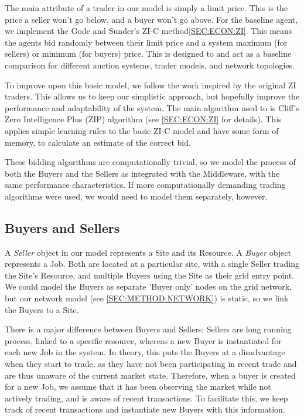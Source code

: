 The main attribute of a trader in our model is simply a limit price. This is
the price a seller won't go below, and a buyer won't go above. For the baseline
agent, we implement the Gode and Sunder's ZI-C method\ref{SEC:ECON:ZI}. This
means the agents bid randomly between their limit price and a system maximum
(for sellers) or minimum (for buyers) price. This is designed to and act as a
baseline comparison for different auction systems, trader models, and network
topologies.

To improve upon this basic model, we follow the work inspired by the original
ZI traders. This allows us to keep our simplistic approach, but hopefully
improve the performance and adaptability of the system. The main algorithm used
to is Cliff's Zero Intelligence Plus (ZIP) algorithm (see \ref{SEC:ECON:ZI} for
details).  This applies simple learning rules to the basic ZI-C model and have
some form of memory, to calculate an estimate of the correct bid. 

These bidding algorithms are computationally trivial, so we model the process
of both the Buyers and the Sellers as integrated with the Middleware, with the
same performance characteristics. If more computationally demanding trading
algorithms were used, we would need to model them separately, however.

\subsection{Buyers and Sellers}

A \textit{Seller} object in our model represents a Site and its Resource.  A
\textit{Buyer} object represents a Job. Both are located at a particular site,
with a single Seller trading the Site's Resource, and multiple Buyers using the
Site as their grid entry point. We could model the Buyers as separate 'Buyer
only' nodes on the grid network, but our network model (see
\ref{SEC:METHOD:NETWORK}) is static, so we link the Buyers to a Site. 

There is a major difference between Buyers and Sellers; Sellers are long running
process, linked to a specific resource, whereas a new Buyer is instantiated for
each new Job in the system. In theory, this puts the Buyers at a disadvantage
when they start to trade, as they have not been participating in recent trade
and are thus unaware of the current market state.  Therefore, when a buyer is
created for a new Job, we assume that it has been observing the market while
not actively trading, and is aware of recent transactions. To facilitate this,
we keep track of recent transactions and instantiate new Buyers with this
information.


